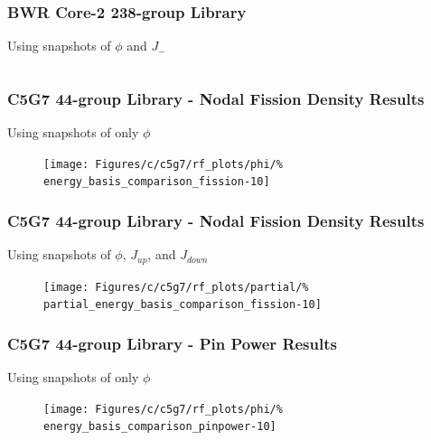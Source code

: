 \documentclass[fleqn]{beamer}
\begin{document}
  \begin{frame}
      \frametitle{BWR Core-2 238-group Library}
      \centering
      Using snapshots of $\phi$ and $J_-$
      \begin{figure}
          \begin{columns}[T]
              \begin{column}{0.5\textwidth}
              \end{column}
              \begin{column}{0.5\textwidth}
              \end{column}
          \end{columns}
      \end{figure}
  \end{frame}
  
    \begin{frame}
    \frametitle{C5G7 44-group Library - Nodal Fission Density Results}
    \centering
    Using snapshots of only $\phi$
    \begin{figure}
    \texttt{[image: Figures/c/c5g7/rf\_plots/phi/\%
        energy\_basis\_comparison\_fission-10]}
    \end{figure}
  \end{frame}
  
  \begin{frame}
    \frametitle{C5G7 44-group Library - Nodal Fission Density Results}
    \centering
    Using snapshots of $\phi$, $J_{up}$, and $J_{down}$
    \begin{figure}
    \texttt{[image: Figures/c/c5g7/rf\_plots/partial/\%
        partial\_energy\_basis\_comparison\_fission-10]}
    \end{figure}
  \end{frame}
  
   \begin{frame}
    \frametitle{C5G7 44-group Library - Pin Power Results}
    \centering
    Using snapshots of only $\phi$
    \begin{figure}
    \texttt{[image: Figures/c/c5g7/rf\_plots/phi/\%
        energy\_basis\_comparison\_pinpower-10]}
    \end{figure}
  \end{frame}
  
\end{document}
